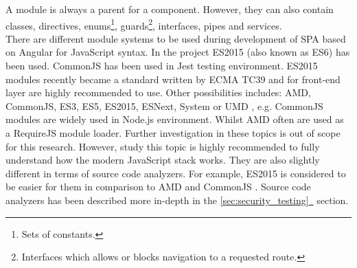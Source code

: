 \documentclass{article} %
\newcommand{\fullref}[1]{\hyperref[#1]{\ref*{#1}\ \nameref*{#1}}}
\begin{document}
A module is always a parent for a component. However, they can also contain classes, directives, enums\footnote{Sets of constants.}, guards\footnote{Interfaces which allows or blocks navigation to a requested route.}, interfaces, pipes and services.\\
\newline
There are different module systems to be used during development of SPA based on Angular for JavaScript syntax. In the project ES2015 (also known as ES6) has been used. CommonJS has been used in Jest testing environment. ES2015 modules recently became a standard written by ECMA TC39 \cite{bib:modules_standard} and for front-end layer are highly recommended to use. Other possibilities includes: AMD, CommonJS, ES3, ES5, ES2015, ESNext, System or UMD \cite{bib:typescript_compiler_settings}, e.g. CommonJS modules are widely used in Node.js environment. Whilst AMD often are used as a RequireJS module loader. Further investigation in these topics is out of scope for this research. However, study this topic is highly recommended to fully understand how the modern JavaScript stack works. They are also slightly different in terms of source code analyzers. For example, ES2015 is considered to be easier for them in comparison to AMD and CommonJS \cite{bib:modules_comparison}. Source code analyzers has been described more in-depth in the \fullref{sec:security_testing} section.
\end{document}
